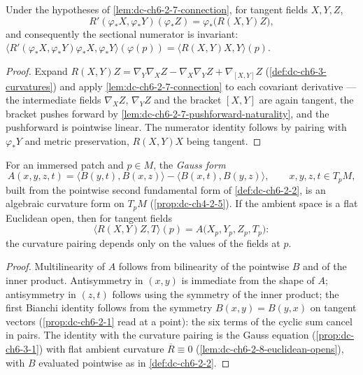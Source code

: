 \begin{lemma}
  \label{lem:dc-ch6-2-7-curvature}


  Under the hypotheses of \cref{lem:dc-ch6-2-7-connection}, for tangent fields
  $X,Y,Z$,
  $$
  R'(\varphi_*X,\varphi_*Y)(\varphi_*Z)=\varphi_*\bigl(R(X,Y)Z\bigr),
  $$
  and consequently the sectional numerator is invariant:
  $\langle R'(\varphi_*X,\varphi_*Y)\varphi_*X,\varphi_*Y\rangle(\varphi(p))
    =\langle R(X,Y)X,Y\rangle(p)$.
\end{lemma}
\begin{proof}

  \sketch
  Expand $R(X,Y)Z=\nabla_Y\nabla_XZ-\nabla_X\nabla_YZ+\nabla_{[X,Y]}Z$
  (\cref{def:dc-ch6-3-curvatures}) and apply
  \cref{lem:dc-ch6-2-7-connection} to each covariant derivative — the
  intermediate fields $\nabla_XZ$, $\nabla_YZ$ and the bracket $[X,Y]$ are
  again tangent, the bracket pushes forward by
  \cref{lem:dc-ch6-2-7-pushforward-naturality}, and the pushforward is
  pointwise linear. The numerator identity follows by pairing with
  $\varphi_*Y$ and metric preservation, $R(X,Y)X$ being tangent.
\end{proof}

\begin{lemma}
  \label{lem:dc-ch6-2-7-gauss-form}


  For an immersed patch and $p\in M$, the \emph{Gauss form}
  $$
  A(x,y,z,t)=\langle B(y,t),B(x,z)\rangle-\langle B(x,t),B(y,z)\rangle,
  \qquad x,y,z,t\in T_pM,
  $$
  built from the pointwise second fundamental form of \cref{def:dc-ch6-2-2},
  is an algebraic curvature form on $T_pM$ (\cref{prop:dc-ch4-2-5}). If the
  ambient space is a flat Euclidean open, then for tangent fields
  $$
  \langle R(X,Y)Z,T\rangle(p)=A\bigl(X_p,Y_p,Z_p,T_p\bigr):
  $$
  the curvature pairing depends only on the values of the fields at $p$.
\end{lemma}
\begin{proof}

  \sketch
  Multilinearity of $A$ follows from bilinearity of the pointwise $B$ and of
  the inner product. Antisymmetry in $(x,y)$ is immediate from the shape of
  $A$; antisymmetry in $(z,t)$ follows using the symmetry of the inner
  product; the first Bianchi identity follows from the symmetry
  $B(x,y)=B(y,x)$ on tangent vectors (\cref{prop:dc-ch6-2-1} read at a
  point): the six terms of the cyclic sum cancel in pairs. The identity with
  the curvature pairing is the Gauss equation (\cref{prop:dc-ch6-3-1}) with
  flat ambient curvature $\overline{R}\equiv 0$
  (\cref{lem:dc-ch6-2-8-euclidean-opens}), with $B$ evaluated pointwise as in
  \cref{def:dc-ch6-2-2}.
\end{proof}

